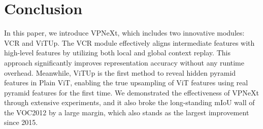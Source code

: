 \section{Conclusion }
In this paper, we introduce VPNeXt, which includes two innovative modules: VCR and ViTUp. The VCR module effectively aligns intermediate features with high-level features by utilizing both local and global context replay. This approach significantly improves representation accuracy without any runtime overhead. Meanwhile, ViTUp is the first method to reveal hidden pyramid features in Plain ViT, enabling the true upsampling of ViT features using real pyramid features for the first time.
%
We demonstrated the effectiveness of VPNeXt through extensive experiments, and it also broke the long-standing mIoU wall of the VOC2012 by a large margin, which also stands as the largest improvement since 2015.